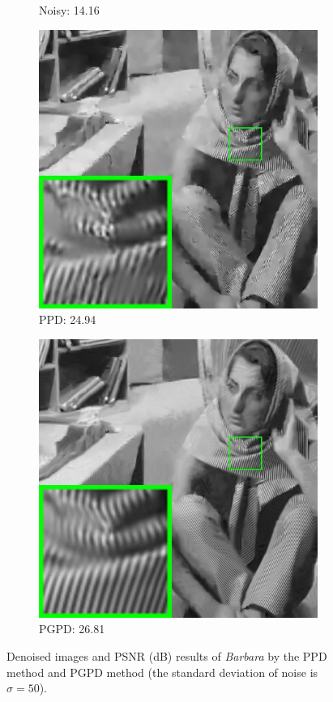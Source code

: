 \begin{figure}
\begin{subfigure}[t]{0.24\textwidth}
		\caption{Noisy: 14.16}
    \end{subfigure}
    \hfill
    \begin{subfigure}[t]{0.24\textwidth}
        \centering
        \includegraphics[width=1\textwidth]{images/pgpd/pgdpd/br_GMM65_50_barbara.jpg}
		\caption{PPD: 24.94}
    \end{subfigure}
    \hfill
    \begin{subfigure}[t]{0.24\textwidth}
        \centering
        \includegraphics[width=1\textwidth]{images/pgpd/pgdpd/br_our_50_barbara.jpg}
		\caption{PGPD: 26.81}
    \end{subfigure}
    \caption{Denoised images and PSNR (dB) results of \textsl{Barbara} by the PPD method and PGPD method (the standard deviation of noise is $\sigma=50$).}
    \label{fig2-8}
\end{figure}


